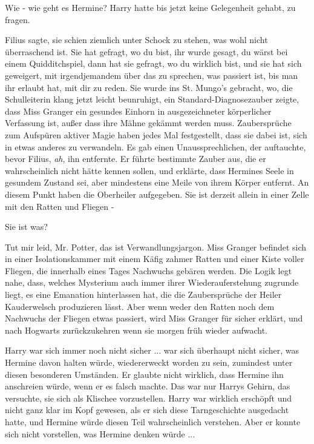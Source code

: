 \glqq{}Wie - wie geht es Hermine?\grqq{} Harry hatte bis jetzt keine Gelegenheit
gehabt, zu fragen.

\glqq{}Filius sagte, sie schien ziemlich unter Schock zu stehen, was wohl nicht
überraschend ist. Sie hat gefragt, wo du bist, ihr wurde gesagt, du wärst bei
einem Quidditchspiel, dann hat sie gefragt, wo du wirklich bist, und sie hat
sich geweigert, mit irgendjemandem über das zu sprechen, was passiert ist, bis
man ihr erlaubt hat, mit dir zu reden. Sie wurde ins St. Mungo's gebracht,
wo\grqq{}, die Schulleiterin klang jetzt leicht beunruhigt, \glqq{}ein
Standard-Diagnosezauber zeigte, dass Miss Granger ein gesundes Einhorn in
ausgezeichneter körperlicher Verfassung ist, außer dass ihre Mähne gekämmt
werden muss. Zaubersprüche zum Aufspüren aktiver Magie haben jedes Mal
festgestellt, dass sie dabei ist, sich in etwas anderes zu verwandeln. Es gab
einen Unaussprechlichen, der auftauchte, bevor Filius, \emph{ah}, ihn entfernte.
Er führte bestimmte Zauber aus, die er wahrscheinlich nicht hätte kennen sollen,
und erklärte, dass Hermines Seele in gesundem Zustand sei, aber mindestens eine
Meile von ihrem Körper entfernt. An diesem Punkt haben die Oberheiler
aufgegeben. Sie ist derzeit allein in einer Zelle mit den Ratten und Fliegen -\grqq{}

\glqq{}Sie ist was?\grqq{}

\glqq{}Tut mir leid, Mr. Potter, das ist Verwandlungsjargon. Miss Granger
befindet sich in einer Isolationskammer mit einem Käfig zahmer Ratten und einer
Kiste voller Fliegen, die innerhalb eines Tages Nachwuchs gebären werden. Die
Logik legt nahe, dass, welches Mysterium auch immer ihrer Wiederauferstehung
zugrunde liegt, es eine Emanation hinterlassen hat, die die Zaubersprüche der
Heiler Kauderwelsch produzieren lässt. Aber wenn weder den Ratten noch dem
Nachwuchs der Fliegen etwas passiert, wird Miss Granger für sicher erklärt, und
nach Hogwarts zurückzukehren wenn sie morgen früh wieder aufwacht.\grqq{}

Harry war sich immer noch nicht sicher ... war sich überhaupt nicht sicher, was
Hermine davon halten würde, wiedererweckt worden zu sein, zumindest unter diesen
besonderen Umständen. Er glaubte nicht wirklich, dass Hermine ihn anschreien
würde, wenn er es falsch machte. Das war nur Harrys Gehirn, das versuchte, sie
sich als Klischee vorzustellen. Harry war wirklich erschöpft und nicht ganz klar
im Kopf gewesen, als er sich diese Tarngeschichte ausgedacht hatte, und Hermine
würde diesen Teil wahrscheinlich verstehen. Aber er konnte sich nicht
vorstellen, was Hermine denken würde ...

